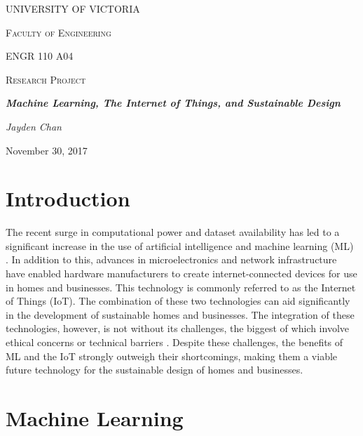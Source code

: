 \documentclass[letterpaper]{article}
\begin{document}
\begin{titlepage}
    \centering
    {\scshape\huge UNIVERSITY OF VICTORIA \par}
    \vspace{1cm}
    {\scshape\LARGE Faculty of Engineering \par\Large ENGR 110 A04\par}
    \vspace{1cm}
    {\scshape\Large Research Project \par}
    \vspace{1.5cm}
    {\huge\bfseries \emph{Machine Learning, The Internet of Things, and Sustainable Design} \par}
    \vspace{2cm}
    {\Large\itshape Jayden Chan \par}
    \vfill
    {\large November 30, 2017\par}
\end{titlepage}

\pagestyle{pageOne}
\section{Introduction}
The recent surge in computational power and dataset availability has led to a significant increase in the use of artificial intelligence and machine learning (ML) \cite{chan17}. In addition to this, advances in microelectronics and network infrastructure have enabled hardware manufacturers to create internet-connected devices for use in homes and businesses. This technology is commonly referred to as the Internet of Things (IoT). The combination of these two technologies can aid significantly in the development of sustainable homes and businesses. The integration of these technologies, however, is not without its challenges, the biggest of which involve ethical concerns or technical barriers \cite{perisic16, mccalman17, pang15}. Despite these challenges, the benefits of ML and the IoT strongly outweigh their shortcomings, making them a viable future technology for the sustainable design of homes and businesses.  

\section{Machine Learning}
\blindtext

\printbibliography
\end{document}
